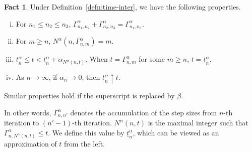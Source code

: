 \documentclass[11pt]{article}
\theoremstyle{plain}
\theoremstyle{definition}
\newtheorem{fact}{Fact}[section]
\newcommand{\ssum}[3]{\sum\limits_{{#1}={#2}}^{#3}}
\begin{document}
\begin{appendix}
\begin{fact}
Under Definition~\ref{defn:time-inter}, we have the following properties. 
\begin{enumerate}[(i)]
    \item For $n_1 \le n_2 \le n_3$, $\Gamma^\alpha_{n_1, n_2} + \Gamma^\alpha_{n_2, n_3} = \Gamma^\alpha_{n_1, n_3}$. 
    \item 
    For $m \ge n$, $N^\alpha(n, \Gamma^\alpha_{n,m}) = m $.
    \item $\underline{t}^\alpha_{n} \le t <  \underline{t}^\alpha_{n} + \alpha_{N^\alpha(n,t)} $. When $t = \Gamma^\alpha_{n, m}$ for some $m \ge n$, $t = \underline{t}^\alpha_{n} $.
    \item  As $n \to \infty$, if $\alpha_{n} \to 0 $, then $\underline{t}^\alpha_{n} \uparrow t$.
\end{enumerate}
Similar properties hold if the superscript is replaced by $\beta$.
\end{fact}

In other words,
$\Gamma^\alpha_{n, n'}$ denotes the accumulation of the step sizes from $n$-th iteration to $(n'-1)$-th iteration.
$N^\alpha(n, t)$ is the maximal integer such that $\Gamma^\alpha_{n, N^\alpha(n, t)} \le t $.
We define this value by $\underline{t}^\alpha_{n} $,
which can be viewed as an approximation of $t$ from the left.




\end{appendix}
\end{document}
